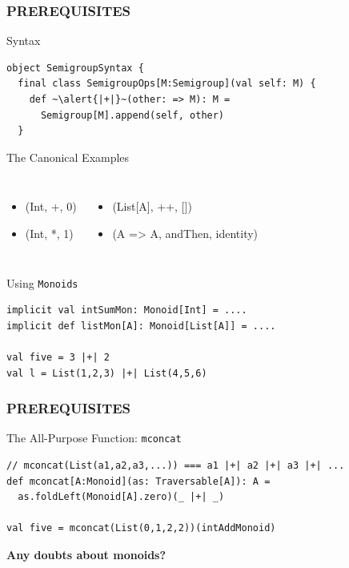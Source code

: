 \documentclass{beamer}
\begin{document}
\begin{frame}[fragile] \frametitle{PREREQUISITES}
  \begin{block}{Syntax}
  \vspace{-0.3cm}
  \begin{lstlisting}
object SemigroupSyntax {
  final class SemigroupOps[M:Semigroup](val self: M) {
    def ~\alert{|+|}~(other: => M): M =
      Semigroup[M].append(self, other)
  }
  \end{lstlisting}
  \vspace{-0.5cm}
  \end{block}

  \vspace{-0.2cm}
  \begin{block}{The Canonical Examples}
  \vspace{-0.3cm}
  \begin{columns}
      \begin{itemize}
        \tt
      \item (Int, +, 0)
      \item (Int, *, 1)
      \end{itemize}
      \begin{itemize}
        \tt
      \item (List[A], ++, [])
      \item (A => A, andThen, identity)
      \end{itemize}
  \end{columns}
  \end{block}
  \vspace{-0.2cm}

  \begin{block}{Using \texttt{Monoids}}
  \vspace{-0.3cm}
  \begin{lstlisting}
implicit val intSumMon: Monoid[Int] = ....
implicit def listMon[A]: Monoid[List[A]] = ....

val five = 3 |+| 2
val l = List(1,2,3) |+| List(4,5,6)
  \end{lstlisting}
  \vspace{-.5cm}
  \end{block}
\end{frame}

\begin{frame}[fragile] \frametitle{PREREQUISITES}
  \begin{block}{The All-Purpose Function: \texttt{mconcat}}
  \begin{lstlisting}
// mconcat(List(a1,a2,a3,...)) === a1 |+| a2 |+| a3 |+| ...
def mconcat[A:Monoid](as: Traversable[A]): A =
  as.foldLeft(Monoid[A].zero)(_ |+| _)

val five = mconcat(List(0,1,2,2))(intAddMonoid)
  \end{lstlisting}
  \end{block}

  \begin{block}{}
    \centering
    \bf
    Any doubts about monoids?
  \end{block}

\end{frame}
\end{document}

